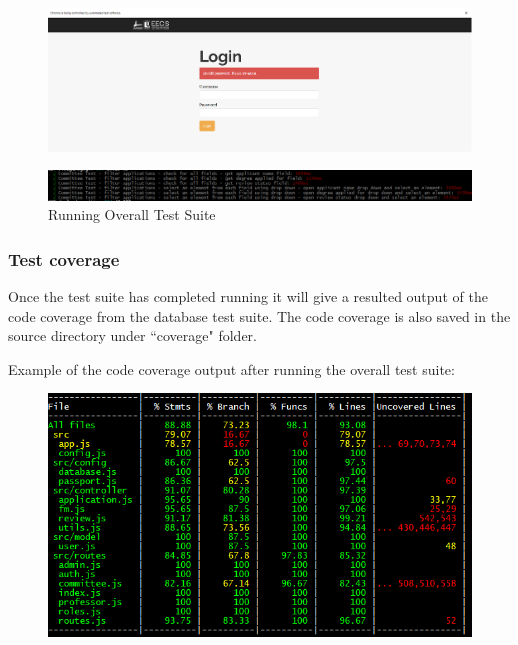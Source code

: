 \documentclass[fontsize=12pt,paper=letter,twoside]{scrartcl}
\begin{document}
\begin{figure}[!htb]
\begin{center}
\includegraphics[width=.9\textwidth]{images/application/run_test.png}
\end{center}
\label{fig:app/run_test}
\end{figure}

\begin{figure}[!htb]
\begin{center}
\includegraphics[width=.9\textwidth]{images/application/run_test2.png}
\end{center}
\caption{Running Overall Test Suite}
\label{fig:app/run_test2}
\end{figure}

\newpage
\subsubsection{Test coverage}
Once the test suite has completed running it will give a resulted output of the code coverage from the database test suite. The code coverage is also saved in the source directory under ``coverage" folder.

\bigskip
\noindent Example of the code coverage output after running the overall test suite:

\begin{figure}[!htb]
\begin{center}
\includegraphics[width=.9\textwidth]{images/coverage.png}
\end{center}
\label{fig:overall/coverage}
\end{figure}
\end{document}

